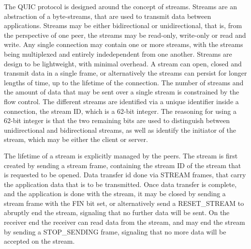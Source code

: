 \documentclass[english, 12pt, a4paper, elec, utf8, a-2b, online]{aaltothesis}
\begin{document}
The QUIC protocol is designed around the concept of streams. Streams are an abstraction
of a byte-streams, that are used to transmit data between applications. Streams may
be either bidirectional or unidirectional, that is, from the perspective of one peer,
the streams may be read-only, write-only or read and write. Any single connection may contain one or
more streams, with the streams being multiplexed and entirely indedependent from one
another. Streams are design to be lightweight, with minimal overhead. A stream can
open, closed and transmit data in a single frame, or alternatively the streams
can persist for longer lengths of time, up to the lifetime of the connection. The number
of streams and the amount of data that may be sent over a single stream is constrained
by the flow control. The different streams are identified via a unique identifier inside a connection,
the stream ID, which is a 62-bit integer. The reasoning for using a 62-bit integer is
that the two remaining bits are used to distinguish between unidirectional and bidirectional
streams, as well as identify the initiator of the stream, which may be either the
client or server\cite{rfc9000}.

The lifetime of a stream is explicitly managed by the peers. The stream is first
created by sending a stream frame, containing the stream ID of the stream that is
requested to be opened. Data transfer id done via STREAM frames, that carry the
application data that is to be transmitted. Once data transfer is complete, and
the application is done with the stream, it may be closed by sending a stream
frame with the FIN bit set, or alternatively send a RESET\_STREAM to abruptly end the
stream, signaling that no further data will be sent. On the receiver end the receiver
can read data from the stream, and may end the stream by sending a STOP\_SENDING frame,
signaling that no more data will be accepted on the stream\cite{rfc9000}.
\end{document}
